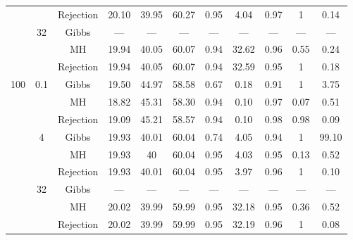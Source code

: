 {\begin{tabular}{ccccccccccc}
   \vspace{0.2cm} &  & Rejection & 20.10 & 39.95 & 60.27 & 0.95 & 4.04 & 0.97 & 1 & 0.14 \\ 
   & 32 & Gibbs & --- & --- & --- & --- & --- & --- & --- & --- \\ 
   &  & MH & 19.94 & 40.05 & 60.07 & 0.94 & 32.62 & 0.96 & 0.55 & 0.24 \\ 
   &  & Rejection & 19.94 & 40.05 & 60.07 & 0.94 & 32.59 & 0.95 & 1 & 0.18 \\ 
   \cmidrule{1-11} 
 100 & 0.1 & Gibbs & 19.50 & 44.97 & 58.58 & 0.67 & 0.18 & 0.91 & 1 & 3.75 \\ 
   &  & MH & 18.82 & 45.31 & 58.30 & 0.94 & 0.10 & 0.97 & 0.07 & 0.51 \\ 
   \vspace{0.2cm} &  & Rejection & 19.09 & 45.21 & 58.57 & 0.94 & 0.10 & 0.98 & 0.98 & 0.09 \\ 
   & 4 & Gibbs & 19.93 & 40.01 & 60.04 & 0.74 & 4.05 & 0.94 & 1 & 99.10 \\ 
   &  & MH & 19.93 & 40 & 60.04 & 0.95 & 4.03 & 0.95 & 0.13 & 0.52 \\ 
   \vspace{0.2cm} &  & Rejection & 19.93 & 40.01 & 60.04 & 0.95 & 3.97 & 0.96 & 1 & 0.10 \\ 
   & 32 & Gibbs & --- & --- & --- & --- & --- & --- & --- & --- \\ 
   &  & MH & 20.02 & 39.99 & 59.99 & 0.95 & 32.18 & 0.95 & 0.36 & 0.52 \\ 
   &  & Rejection & 20.02 & 39.99 & 59.99 & 0.95 & 32.19 & 0.96 & 1 & 0.08 \\ 
   \bottomrule 
\end{tabular}
}
